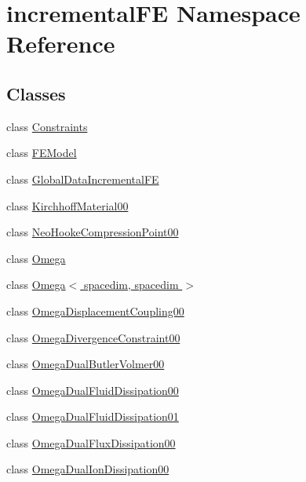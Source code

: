 \hypertarget{namespaceincremental_f_e}{}\section{incremental\+FE Namespace Reference}
\label{namespaceincremental_f_e}
\subsection*{Classes}
\begin{DoxyCompactItemize}
\item 
class \hyperlink{classincremental_f_e_1_1_constraints}{Constraints}
\item 
class \hyperlink{classincremental_f_e_1_1_f_e_model}{F\+E\+Model}
\item 
class \hyperlink{classincremental_f_e_1_1_global_data_incremental_f_e}{Global\+Data\+Incremental\+FE}
\item 
class \hyperlink{classincremental_f_e_1_1_kirchhoff_material00}{Kirchhoff\+Material00}
\item 
class \hyperlink{classincremental_f_e_1_1_neo_hooke_compression_point00}{Neo\+Hooke\+Compression\+Point00}
\item 
class \hyperlink{classincremental_f_e_1_1_omega}{Omega}
\item 
class \hyperlink{classincremental_f_e_1_1_omega_3_01spacedim_00_01spacedim_01_4}{Omega$<$ spacedim, spacedim $>$}
\item 
class \hyperlink{classincremental_f_e_1_1_omega_displacement_coupling00}{Omega\+Displacement\+Coupling00}
\item 
class \hyperlink{classincremental_f_e_1_1_omega_divergence_constraint00}{Omega\+Divergence\+Constraint00}
\item 
class \hyperlink{classincremental_f_e_1_1_omega_dual_butler_volmer00}{Omega\+Dual\+Butler\+Volmer00}
\item 
class \hyperlink{classincremental_f_e_1_1_omega_dual_fluid_dissipation00}{Omega\+Dual\+Fluid\+Dissipation00}
\item 
class \hyperlink{classincremental_f_e_1_1_omega_dual_fluid_dissipation01}{Omega\+Dual\+Fluid\+Dissipation01}
\item 
class \hyperlink{classincremental_f_e_1_1_omega_dual_flux_dissipation00}{Omega\+Dual\+Flux\+Dissipation00}
\item 
class \hyperlink{classincremental_f_e_1_1_omega_dual_ion_dissipation00}{Omega\+Dual\+Ion\+Dissipation00}
\item 

\end{DoxyCompactItemize}
